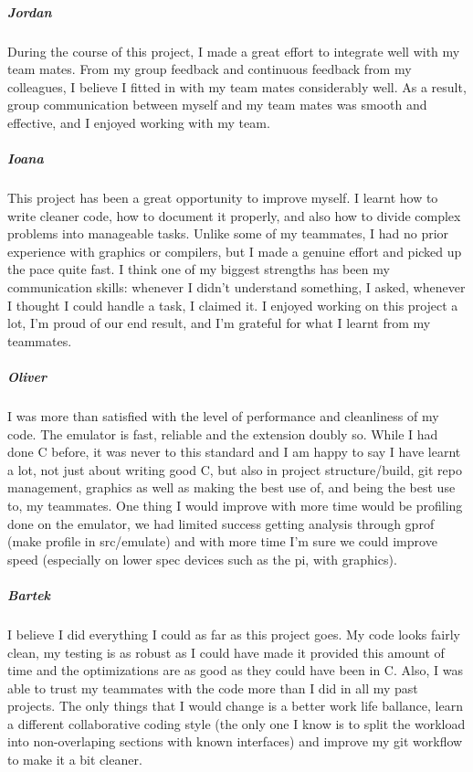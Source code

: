 \documentclass[11pt]{article}
\begin{document}
\subparagraph*{Jordan}
During the course of this project, I made a great effort to integrate well with my team mates. From my group feedback and continuous feedback from my colleagues, I believe I fitted in with my team mates considerably well. As a result, group communication between myself and my team mates was smooth and effective, and I enjoyed working with my team.
\subparagraph*{Ioana}
This project has been a great opportunity to improve myself. I learnt how to write cleaner code, how to document it properly, and also how to divide complex problems into manageable tasks. Unlike some of my teammates, I had no prior experience with graphics or compilers, but I made a genuine effort and picked up the pace quite fast. I think one of my biggest strengths has been my communication skills: whenever I didn't understand something, I asked, whenever I thought I could handle a task, I claimed it. I enjoyed working on this project a lot, I'm proud of our end result, and I'm grateful for what I learnt from my teammates.
\subparagraph*{Oliver}
I was more than satisfied with the level of performance and cleanliness of my code. The emulator is fast, reliable and the extension doubly so. While I had done C before, it was never to this standard and I am happy to say I have learnt a lot, not just about writing good C, but also in project structure/build, git repo management, graphics as well as making the best use of, and being the best use to, my teammates. One thing I would improve with more time would be profiling done on the emulator, we had limited success getting analysis through gprof (make profile in src/emulate) and with more time I'm sure we could improve speed (especially on lower spec devices such as the pi, with graphics).
\subparagraph*{Bartek}
I believe I did everything I could as far as this project goes. My code looks fairly clean, my testing is as robust as I could have made it provided this amount of time and the optimizations are as good as they could have been in C. Also, I was able to trust my teammates with the code more than I did in all my past projects. The only things that I would change is a better work life ballance, learn a different collaborative coding style (the only one I know is to split the workload into non-overlaping sections with known interfaces) and improve my git workflow to make it a bit cleaner.
\end{document}
